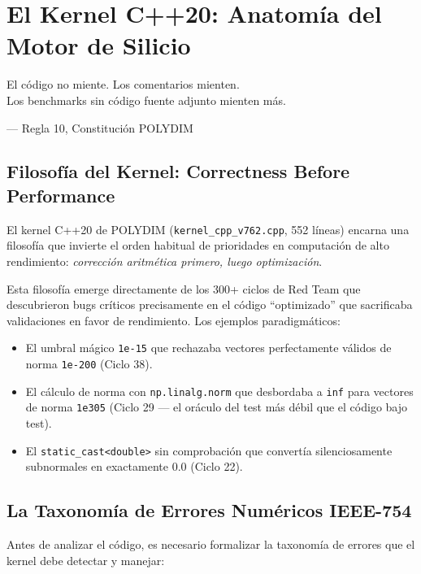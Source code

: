 \chapter{El Kernel C++20: Anatomía del Motor de Silicio}
\label{ch:kernel_cpp}

\epigraph{El código no miente. Los comentarios mienten.\\
Los benchmarks sin código fuente adjunto mienten más.}{--- Regla 10, Constitución POLYDIM}

\section{Filosofía del Kernel: Correctness Before Performance}

El kernel C++20 de POLYDIM (\texttt{kernel\_cpp\_v762.cpp}, 552 líneas) encarna
una filosofía que invierte el orden habitual de prioridades en computación de alto
rendimiento: \textit{corrección aritmética primero, luego optimización}.

Esta filosofía emerge directamente de los 300+ ciclos de Red Team que descubrieron
bugs críticos precisamente en el código ``optimizado'' que sacrificaba validaciones
en favor de rendimiento. Los ejemplos paradigmáticos:

\begin{itemize}
\item El umbral mágico \texttt{1e-15} que rechazaba vectores perfectamente válidos
de norma \texttt{1e-200} (Ciclo 38).
\item El cálculo de norma con \texttt{np.linalg.norm} que desbordaba a \texttt{inf}
para vectores de norma \texttt{1e305} (Ciclo 29 --- el oráculo del test más débil
que el código bajo test).
\item El \texttt{static\_cast<double>} sin comprobación que convertía silenciosamente
subnormales en exactamente 0.0 (Ciclo 22).
\end{itemize}

\section{La Taxonomía de Errores Numéricos IEEE-754}

Antes de analizar el código, es necesario formalizar la taxonomía de errores que
el kernel debe detectar y manejar:

